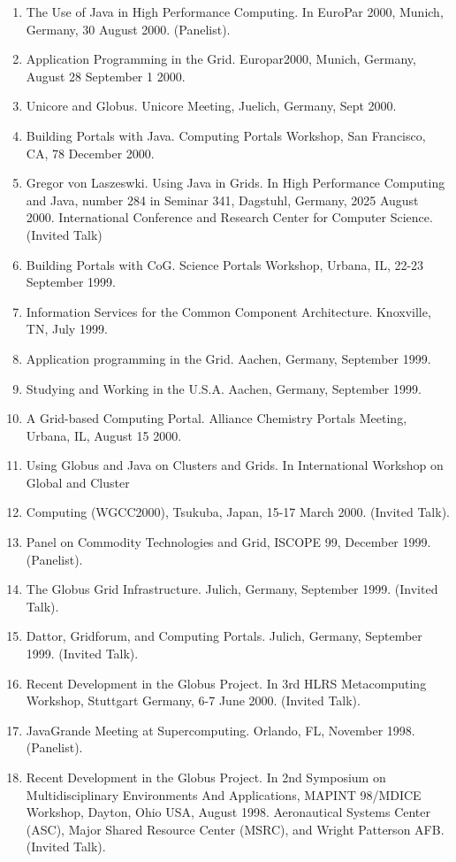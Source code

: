 \documentclass{article}
\begin{document}
\begin{enumerate}
\item  The Use of Java in High Performance Computing. In EuroPar 2000, Munich, Germany, 30 August 2000. (Panelist). 
\item  Application Programming in the Grid. Europar2000, Munich, Germany, August 28 September 1 2000. 
\item  Unicore and Globus. Unicore Meeting, Juelich, Germany, Sept 2000. 
\item  Building Portals with Java. Computing Portals Workshop, San Francisco, CA, 78 December 2000. 
\item  Gregor von Laszeswki. Using Java in Grids. In High Performance Computing and Java, number 284 in Seminar 341, Dagstuhl, Germany, 2025 August 2000. International Conference and Research Center for Computer Science. (Invited Talk) 
\item  Building Portals with CoG. Science Portals Workshop, Urbana, IL, 22-23 September 1999. 
\item  Information Services for the Common Component Architecture. Knoxville, TN, July 1999. 
\item  Application programming in the Grid. Aachen, Germany, September 1999. 
\item  Studying and Working in the U.S.A. Aachen, Germany, September 1999. 
\item  A Grid-based Computing Portal. Alliance Chemistry Portals Meeting, Urbana, IL, August 15 2000. 
\item  Using Globus and Java on Clusters and Grids. In International Workshop on Global and Cluster 
\item  Computing (WGCC2000), Tsukuba, Japan, 15-17 March 2000. (Invited Talk). 
\item  Panel on Commodity Technologies and Grid, ISCOPE 99, December 1999. (Panelist). 
\item  The Globus Grid Infrastructure. Julich, Germany, September 1999. (Invited Talk). 
\item  Dattor, Gridforum, and Computing Portals. Julich, Germany, September 1999. (Invited Talk). 
\item  Recent Development in the Globus Project. In 3rd HLRS Metacomputing Workshop, Stuttgart Germany, 6-7 June 2000. (Invited Talk). 
\item  JavaGrande Meeting at Supercomputing. Orlando, FL, November 1998. (Panelist). 
\item  Recent Development in the Globus Project. In 2nd Symposium on Multidisciplinary Environments And Applications, MAPINT 98/MDICE Workshop, Dayton, Ohio USA, August 1998. Aeronautical Systems Center (ASC), Major Shared Resource Center (MSRC), and Wright Patterson AFB. (Invited Talk). 

\end{enumerate}
\end{document}
